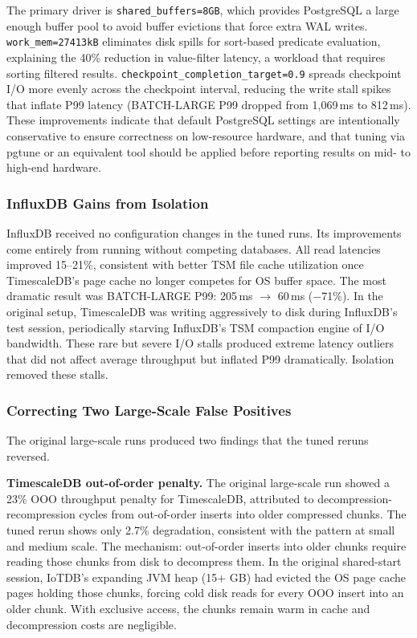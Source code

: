 The primary driver is \texttt{shared\_buffers=8GB}, which provides PostgreSQL a large
enough buffer pool to avoid buffer evictions that force extra WAL writes.
\texttt{work\_mem=27413kB} eliminates disk spills for sort-based predicate evaluation,
explaining the 40\% reduction in value-filter latency, a workload that requires sorting
filtered results. \texttt{checkpoint\_completion\_target=0.9} spreads checkpoint I/O more
evenly across the checkpoint interval, reducing the write stall spikes that inflate P99
latency (BATCH-LARGE P99 dropped from 1{,}069\,ms to 812\,ms). These improvements
indicate that default PostgreSQL settings are intentionally conservative to ensure
correctness on low-resource hardware, and that tuning via pgtune or an equivalent tool
should be applied before reporting results on mid- to high-end hardware.

\subsubsection{InfluxDB Gains from Isolation}

InfluxDB received no configuration changes in the tuned runs. Its improvements come entirely
from running without competing databases. All read latencies improved 15--21\%, consistent
with better TSM file cache utilization once TimescaleDB's page cache no longer competes for
OS buffer space. The most dramatic result was BATCH-LARGE P99: 205\,ms $\to$ 60\,ms
($-$71\%). In the original setup, TimescaleDB was writing aggressively to disk during
InfluxDB's test session, periodically starving InfluxDB's TSM compaction engine of I/O
bandwidth. These rare but severe I/O stalls produced extreme latency outliers that did not
affect average throughput but inflated P99 dramatically. Isolation removed these stalls.

\subsubsection{Correcting Two Large-Scale False Positives}

The original large-scale runs produced two findings that the tuned reruns reversed.

\textbf{TimescaleDB out-of-order penalty.} The original large-scale run showed a 23\%
OOO throughput penalty for TimescaleDB, attributed to decompression-recompression cycles
from out-of-order inserts into older compressed chunks. The tuned rerun shows only 2.7\%
degradation, consistent with the pattern at small and medium scale. The mechanism:
out-of-order inserts into older chunks require reading those chunks from disk to decompress
them. In the original shared-start session, IoTDB's expanding JVM heap (15+ GB) had evicted
the OS page cache pages holding those chunks, forcing cold disk reads for every OOO insert
into an older chunk. With exclusive access, the chunks remain warm in cache and decompression
costs are negligible.


